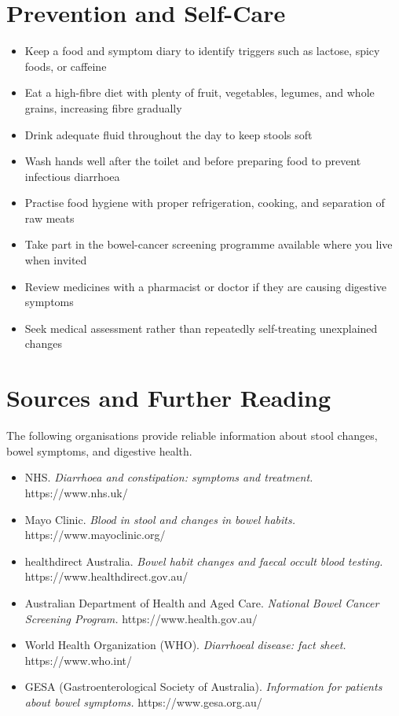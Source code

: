 \section*{Prevention and Self-Care}
\begin{itemize}
    \item Keep a food and symptom diary to identify triggers such as lactose, spicy foods, or caffeine
    \item Eat a high-fibre diet with plenty of fruit, vegetables, legumes, and whole grains, increasing fibre gradually
    \item Drink adequate fluid throughout the day to keep stools soft
    \item Wash hands well after the toilet and before preparing food to prevent infectious diarrhoea
    \item Practise food hygiene with proper refrigeration, cooking, and separation of raw meats
    \item Take part in the bowel-cancer screening programme available where you live when invited
    \item Review medicines with a pharmacist or doctor if they are causing digestive symptoms
    \item Seek medical assessment rather than repeatedly self-treating unexplained changes
\end{itemize}

\section*{Sources and Further Reading}
The following organisations provide reliable information about stool changes, bowel symptoms, and digestive health.

\begin{itemize}
    \item NHS. \textit{Diarrhoea and constipation: symptoms and treatment.} https://www.nhs.uk/
    \item Mayo Clinic. \textit{Blood in stool and changes in bowel habits.} https://www.mayoclinic.org/
    \item healthdirect Australia. \textit{Bowel habit changes and faecal occult blood testing.} https://www.healthdirect.gov.au/
    \item Australian Department of Health and Aged Care. \textit{National Bowel Cancer Screening Program.} https://www.health.gov.au/
    \item World Health Organization (WHO). \textit{Diarrhoeal disease: fact sheet.} https://www.who.int/
    \item GESA (Gastroenterological Society of Australia). \textit{Information for patients about bowel symptoms.} https://www.gesa.org.au/
\end{itemize}

\clearpage

